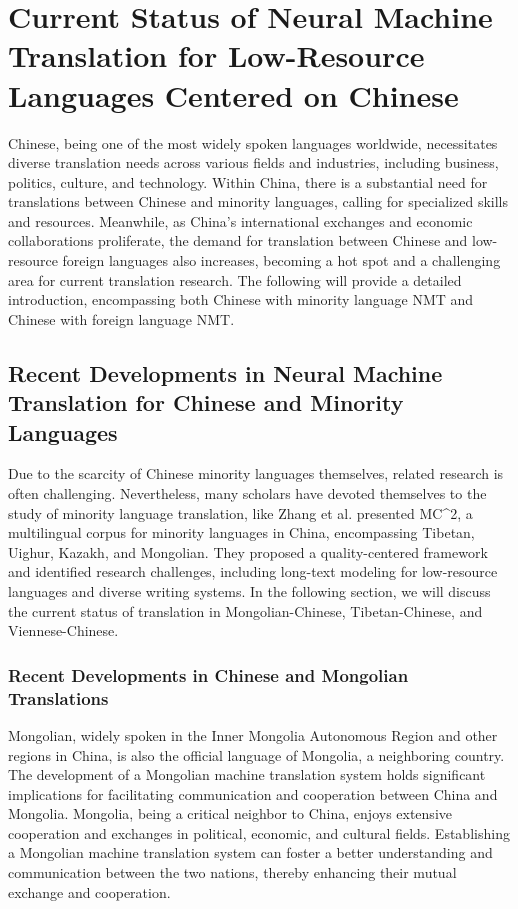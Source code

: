\documentclass[acmsmall]{acmart}
\begin{document}
\section{Current Status of Neural Machine Translation for Low-Resource Languages Centered on Chinese}
\label{sec5}
Chinese, being one of the most widely spoken languages worldwide, necessitates diverse translation needs across various fields and industries, including business, politics, culture, and technology. Within China, there is a substantial need for translations between Chinese and minority languages, calling for specialized skills and resources. Meanwhile, as China's international exchanges and economic collaborations proliferate, the demand for translation between Chinese and low-resource foreign languages also increases, becoming a hot spot and a challenging area for current translation research. The following will provide a detailed introduction, encompassing both Chinese with minority language NMT and Chinese with foreign language NMT.

\subsection{Recent Developments in Neural Machine Translation for Chinese and Minority Languages}
\color{green}
Due to the scarcity of Chinese minority languages themselves, related research is often challenging. Nevertheless, many scholars have devoted themselves to the study of minority language translation, like Zhang et al. \cite{DBLP:journals/corr/abs-2311-08348} presented MC\^{}2, a multilingual corpus for minority languages in China, encompassing Tibetan, Uighur, Kazakh, and Mongolian. They proposed a quality-centered framework and identified research challenges, including long-text modeling for low-resource languages and diverse writing systems. In the following section, we will discuss the current status of translation in Mongolian-Chinese, Tibetan-Chinese, and Viennese-Chinese.
\color{black}
\subsubsection{Recent Developments in Chinese and Mongolian Translations}
\label{6.1.1}
Mongolian, widely spoken in the Inner Mongolia Autonomous Region and other regions in China, is also the official language of Mongolia, a neighboring country. The development of a Mongolian machine translation system holds significant implications for facilitating communication and cooperation between China and Mongolia. Mongolia, being a critical neighbor to China, enjoys extensive cooperation and exchanges in political, economic, and cultural fields. Establishing a Mongolian machine translation system can foster a better understanding and communication between the two nations, thereby enhancing their mutual exchange and cooperation. 
\end{document}
